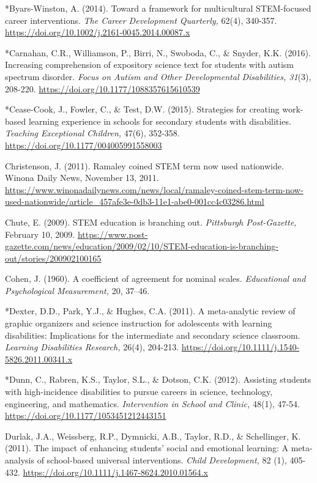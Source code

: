 \documentclass[11.5pt]{sig-alternate}
\begin{document}
*Byars-Winston, A. (2014). Toward a framework for multicultural STEM-focused career interventions. \textit{The Career Development Quarterly,} 62(4), 340-357.  \url{https://doi.org/10.1002/j.2161-0045.2014.00087.x}

*Carnahan, C.R., Williamson, P., Birri, N., Swoboda, C., \& Snyder, K.K. (2016). Increasing comprehension of expository science text for students with autism spectrum disorder. \textit{Focus on Autism and Other Developmental Disabilities, 31}(3), 208-220. \url{https://doi.org/10.1177/1088357615610539}

*Cease-Cook, J., Fowler, C., \& Test, D.W. (2015). Strategies for creating work-based learning experience in schools for secondary students with disabilities. \textit{Teaching Exceptional Children,} 47(6), 352-358. \url{https://doi.org/10.1177/004005991558003}

Christenson, J. (2011). Ramaley coined STEM term now used nationwide. Winona Daily News, November 13, 2011. \url{https://www.winonadailynews.com/news/local/ramaley-coined-stem-term-now-used-nationwide/article\_457afe3e-0db3-11e1-abe0-001cc4c03286.html}

Chute, E. (2009). STEM education is branching out. \textit{Pittsburgh Post-Gazette,} February 10, 2009. \url{https://www.post-gazette.com/news/education/2009/02/10/STEM-education-is-branching-out/stories/200902100165}

Cohen, J. (1960). A coefficient of agreement for nominal scales. \textit{Educational and Psychological Measurement,} 20, 37–46. 

*Dexter, D.D., Park, Y.J., \& Hughes, C.A. (2011). A meta-analytic review of graphic organizers and science instruction for adolescents with learning disabilities: Implications for the intermediate and secondary science classroom. \textit{Learning Disabilities Research,} 26(4), 204-213. \url{https://doi.org/10.1111/j.1540-5826.2011.00341.x}

*Dunn, C., Rabren, K.S., Taylor, S.L., \& Dotson, C.K. (2012). Assisting students with high-incidence disabilities to pursue careers in science, technology, engineering, and mathematics. \textit{Intervention in School and Clinic,} 48(1), 47-54. \url{https://doi.org/10.1177/1053451212443151}
 
Durlak, J.A., Weissberg, R.P., Dymnicki, A.B., Taylor, R.D., \& Schellinger, K. (2011). The impact of enhancing students’ social and emotional learning: A meta-analysis of school-based universal interventions. \textit{Child Development,} 82 (1), 405-432. \url{https://doi.org/10.1111/j.1467-8624.2010.01564.x}
 
\end{document}
